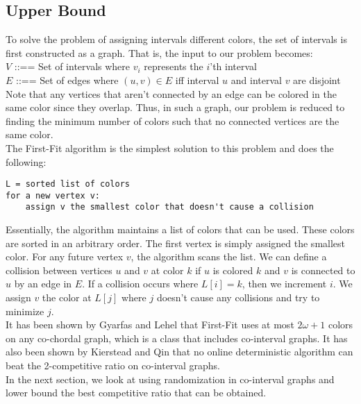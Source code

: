 \documentclass{article}
\begin{document}
\subsection{Upper Bound}
To solve the problem of assigning intervals different colors, the set of intervals is first constructed as a graph. That is, the input to our problem becomes:
\\$V$ ::== Set of intervals where $v_i$ represents the $i$'th interval
\\$E$ ::== Set of edges where $(u,v) \in E$ iff interval $u$ and interval $v$ are disjoint
\\Note that any vertices that aren't connected by an edge can be colored in the same color since they overlap. Thus, in such a graph, our problem is reduced to finding the minimum number of colors such that no connected vertices are the same color.
\\The First-Fit algorithm is the simplest solution to this problem and does the following:
\begin{verbatim}
L = sorted list of colors
for a new vertex v:
    assign v the smallest color that doesn't cause a collision
\end{verbatim}
Essentially, the algorithm maintains a list of colors that can be used. These colors are sorted in an arbitrary order. The first vertex is simply assigned the smallest color. For any future vertex $v$, the algorithm scans the list. We can define a collision between vertices $u$ and $v$ at color $k$ if $u$ is colored $k$ and $v$ is connected to $u$ by an edge in $E$. If a collision occurs where $L[i] = k$, then we increment $i$. We assign $v$ the color at $L[j]$ where $j$ doesn't cause any collisions and try to minimize $j$.
\\It has been shown by Gyarfas and Lehel that First-Fit uses at most $2\omega+1$ colors on any co-chordal graph, which is a class that includes co-interval graphs. It has also been shown by Kierstead and Qin that no online deterministic algorithm can beat the 2-competitive ratio on co-interval graphs.
\\In the next section, we look at using randomization in co-interval graphs and lower bound the best competitive ratio that can be obtained.
\end{document}
